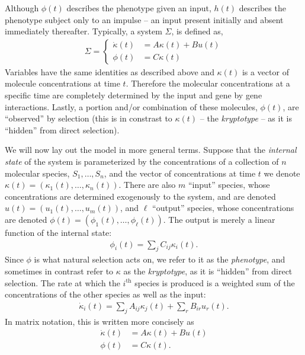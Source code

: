 \documentclass{article}
\newcommand{\ddt}{\dot}
\newcommand{\1}{\mathbbm{1}}
\begin{document}
{  Although $\phi(t)$ describes the phenotype given an input, $h(t)$ describes the phenotype subject only to an impulse -- an input present initially and absent immediately thereafter. Typically, a system $\Sigma$, is defined as,
  \begin{align}
    \Sigma = \left\{ \begin{array}{ll} \dot{\kappa}(t) &= A \kappa(t) + B u(t) \\ \phi(t) &= C \kappa(t) \end{array} \right.
  \end{align}
  Variables have the same identities as described above and $\kappa(t)$ is a vector of molecule concentrations at time $t$. Therefore the molecular concentrations at a specific time are completely determined by the input and gene by gene interactions. Lastly, a portion and/or combination of these molecules, $\phi(t)$, are ``observed'' by selection (this is in constrast to $\kappa(t)$ -- the \emph{kryptotype} -- as it is ``hidden'' from direct selection).
}

We will now lay out the model in more general terms.
Suppose that the \emph{internal state} of the system
is parameterized by the concentrations of a collection of $n$ molecular species,
$S_1, \ldots, S_n$,
and the vector of concentrations at time $t$ we denote $\kappa(t)=(\kappa_1(t),\ldots,\kappa_n(t))$.
There are also $m$ ``input'' species, whose concentrations are determined
exogenously to the system,
and are denoted $u(t) = (u_1(t),\ldots,u_m(t))$,
and $\ell$ ``output'' species, whose concentrations are denoted
$\phi(t) = (\phi_1(t),\ldots,\phi_\ell(t))$.
The output is merely a linear function of the internal state:
\begin{align*}
    \phi_i(t) = \sum_j C_{ij} \kappa_i(t).
\end{align*}
Since $\phi$ is what natural selection acts on, we refer to it as the \emph{phenotype},
and sometimes in contrast refer to $\kappa$ as the \emph{kryptotype},
as it is ``hidden'' from direct selection.
The rate at which the $i^\text{th}$ species is produced
is a weighted sum of the concentrations of the other species
as well as the input:
\begin{align*}
    \ddt \kappa_i(t) = \sum_j A_{ij} \kappa_j(t) + \sum_r B_{ir} u_r(t) .
\end{align*}
In matrix notation, this is written more concisely as
\begin{align} \label{eqn:lti_system}
    \ddt \kappa(t) &= A \kappa(t) + B u(t) \\
    \phi(t) &= C \kappa(t) .
\end{align}
\end{document}
